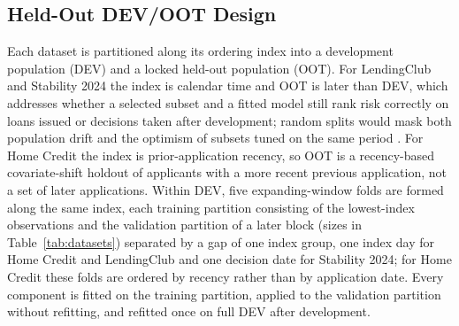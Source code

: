 \documentclass[final,5p,twocolumn]{elsarticle}
\begin{document}
\subsection{Held-Out DEV/OOT Design}
\label{subsec:dev_oot}

Each dataset is partitioned along its ordering index into a development population (DEV) and a locked held-out population (OOT). For LendingClub and Stability 2024 the index is calendar time and OOT is later than DEV, which addresses whether a selected subset and a fitted model still rank risk correctly on loans issued or decisions taken after development; random splits would mask both population drift and the optimism of subsets tuned on the same period \cite{bergmeir2012,gama2014}. For Home Credit the index is prior-application recency, so OOT is a recency-based covariate-shift holdout of applicants with a more recent previous application, not a set of later applications. Within DEV, five expanding-window folds are formed along the same index, each training partition consisting of the lowest-index observations and the validation partition of a later block (sizes in Table~\ref{tab:datasets}) separated by a gap of one index group, one index day for Home Credit and LendingClub and one decision date for Stability 2024; for Home Credit these folds are ordered by recency rather than by application date. Every component is fitted on the training partition, applied to the validation partition without refitting, and refitted once on full DEV after development.
\end{document}
